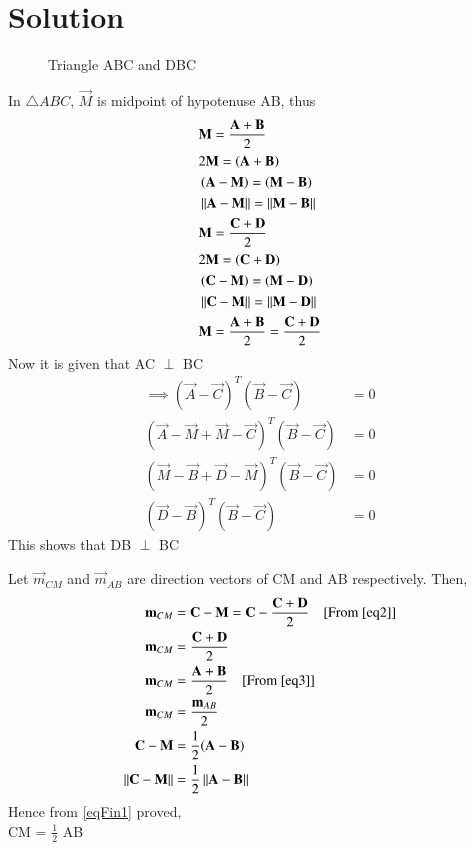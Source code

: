 \documentclass[journal,12pt,twocolumn]{IEEEtran}
\begin{document}
\section{Solution}
\renewcommand{\thefigure}{1}
\begin{figure}[hb]
\centering
\resizebox{.9\linewidth}{!}{}
\caption{Triangle ABC and DBC}
\label{myfig}
\end{figure}
In $\triangle{ABC}$, $\vec{M}$ is midpoint of hypotenuse AB, thus 
\begin{align}
&\mathbf{M} = \frac{\mathbf{A}+\mathbf{B}}{2}\label{eq1} \\
&2\mathbf{M} = \left(\mathbf{A+B}\right)\\
&\left(\mathbf{A-M}\right) = \left(\mathbf{M-B}\right)\\
&\left\lVert\mathbf{A}-\mathbf{M}\right\rVert=\left\lVert\mathbf{M}-\mathbf{B}\right\rVert\label{eq4} \\
&\mathbf{M} = \frac{\mathbf{C}+\mathbf{D}}{2}\label{eq2} \\
&2\mathbf{M} = \left(\mathbf{C+D}\right)\\
&\left(\mathbf{C-M}\right) = \left(\mathbf{M-D}\right)\\
&\left\lVert\mathbf{C}-\mathbf{M}\right\rVert=\left\lVert\mathbf{M}-\mathbf{D}\right\rVert\label{eq5} \\
&\mathbf{M} = \frac{\mathbf{A}+\mathbf{B}}{2} = \frac{\mathbf{C}+\mathbf{D}}{2}\label{eq3}
\end{align} 
Now it is given that AC $\perp$ BC 
\begin{align}
\implies(\vec A -\vec C)^T(\vec{B}-\vec{C}) &= 0 \\
(\vec A -\vec M +\vec M -\vec C)^T(\vec{B}-\vec{C}) &= 0 \\
(\vec M -\vec B +\vec D -\vec M)^T(\vec{B}-\vec{C}) &= 0 \\
(\vec D -\vec B)^T(\vec{B}-\vec{C}) &= 0 
\end{align}
This shows that DB $\perp$ BC 

Let $\vec{m}_{CM}$ and $\vec{m}_{AB}$ are direction vectors of CM and AB respectively. Then,
\begin{align}
\mathbf{m}_{CM} &= \mathbf{C} - \mathbf{M} =   
\mathbf{C} - \frac{\mathbf{C}+\mathbf{D}}{2} \quad\text{[From \eqref{eq2}]} \\
\mathbf{m}_{CM} &= \frac{\mathbf{C}+\mathbf{D}}{2} \\
\mathbf{m}_{CM} &= \frac{\mathbf{A}+\mathbf{B}}{2} \quad\text{[From \eqref{eq3}]} \\
\mathbf{m}_{CM} &= \frac{\mathbf{m}_{AB}}{2} \\
\mathbf{C - M} &= \frac{1}{2}(\mathbf{A-B}) \\
\left\lVert\mathbf{C - M}\right\rVert &= \frac{1}{2}\left\lVert\mathbf{A-B}\right\rVert\label{eqFin1}
\end{align}
Hence from \eqref{eqFin1} proved,\\CM = $\frac{1}{2}$ AB
\end{document}
